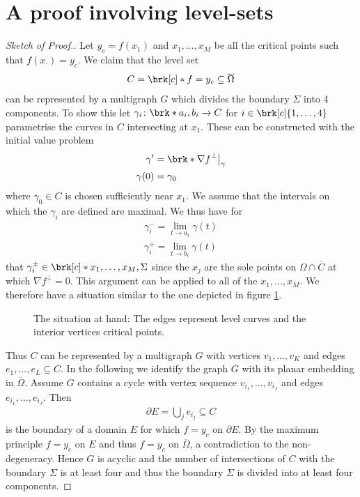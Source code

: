 \section{A proof involving level-sets}

\begin{proof}[Sketch of Proof.]
  Let $y_c=f(x_1)$ and $x_1,\dots,x_M$ be all the critical points such that $f(x_\cdot)=y_c$.
  We claim that the level set
  \begin{align*}
    C=\brk[c]*{f=y_c}\subseteq\overline{\Omega}
  \end{align*}
  can be represented by a multigraph $G$
  which divides the boundary $\Sigma$ into 4 components. To show this let $\gamma_i\colon \brk*{a_i,b_i}\to C$ for $i\in\brk[c]{1,\dots,4}$ parametrise the curves in
  $C$ intersecting at $x_1$. These can be constructed with the initial value problem
  \begin{align*} 
    \gamma'&=\brk*{\nabla f}^\perp\big\vert_\gamma \\
    \gamma(0) &= \gamma_0
  \end{align*}
  where $\gamma_0\in C$ is chosen sufficiently near $x_1$. We assume that the intervals on which the $\gamma_i$ are
  defined are maximal. We thus have for
  \begin{align*}
    \gamma_i^-=\lim_{t\to a_i}\gamma(t) \\
    \gamma_i^+=\lim_{t\to b_i}\gamma(t)
  \end{align*}
  that $\gamma_i^\pm\in\brk[c]*{x_1,\dots,x_M,\Sigma}$ since the $x_j$ are the sole points on $\Omega\cap\overline{C}$
  at which $\nabla f^\perp=0$. This argument can be applied to all of the 
  $x_1,\dots,x_M$. We therefore have a situation similar to the one depicted in figure \ref{fi:n2:levelSets:overview}.
  
  \begin{figure}
    \centering
    \def\svgwidth{0.8\textwidth}
    
    \caption{The situation at hand: The edges represent level curves and the interior vertices critical points.}
    \label{fi:n2:levelSets:overview}
  \end{figure}

  Thus $C$ can be represented by a multigraph $G$ with vertices $v_1,\dots,v_K$ and edges $e_1,\dots,e_L\subseteq C$.
  In the following we identify the graph $G$ with its planar embedding in $\overline{\Omega}$.
  Assume $G$ contains a cycle with vertex sequence $v_{i_1},\dots,v_{i_J}$ and edges $e_{i_1},\dots,e_{i_J}$. Then
  \begin{align*}
    \partial E = \bigcup_j e_{i_j}\subseteq C
  \end{align*}
  is the boundary of a domain $E$ for which $f=y_c$ on $\partial E$. By the maximum principle $f=y_c$ on $E$ and thus
  $f=y_c$ on $\overline{\Omega}$, a contradiction to the non-degeneracy. Hence $G$ is acyclic and the number of 
  intersections of $C$ with the boundary $\Sigma$ is at least four and thus the boundary $\Sigma$ is divided into at least four components.
  

\end{proof}
